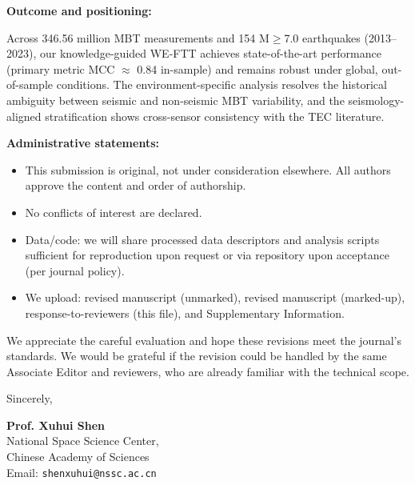 \documentclass[12pt]{article}
\begin{document}
\medskip

\noindent\textbf{Outcome and positioning:}

Across 346.56 million MBT measurements and 154 M$\ge$7.0 earthquakes (2013--2023), our knowledge-guided WE-FTT achieves state-of-the-art performance (primary metric MCC $\approx$ 0.84 in-sample) and remains robust under global, out-of-sample conditions. The environment-specific analysis resolves the historical ambiguity between seismic and non-seismic MBT variability, and the seismology-aligned stratification shows cross-sensor consistency with the TEC literature.

\medskip

\noindent\textbf{Administrative statements:}

\begin{itemize}
\item This submission is original, not under consideration elsewhere. All authors approve the content and order of authorship.
\item No conflicts of interest are declared.
\item Data/code: we will share processed data descriptors and analysis scripts sufficient for reproduction upon request or via repository upon acceptance (per journal policy).
\item We upload: revised manuscript (unmarked), revised manuscript (marked-up), response-to-reviewers (this file), and Supplementary Information.
\end{itemize}

We appreciate the careful evaluation and hope these revisions meet the journal’s standards. We would be grateful if the revision could be handled by the same Associate Editor and reviewers, who are already familiar with the technical scope.

\bigskip

Sincerely,\\[0.5em]
\vspace{2em}

\textbf{Prof. Xuhui Shen}\\
National Space Science Center,\\
Chinese Academy of Sciences\\
Email: \texttt{shenxuhui@nssc.ac.cn}

\bigskip

\newpage

\pagestyle{plain}

\onehalfspacing
\end{document}
